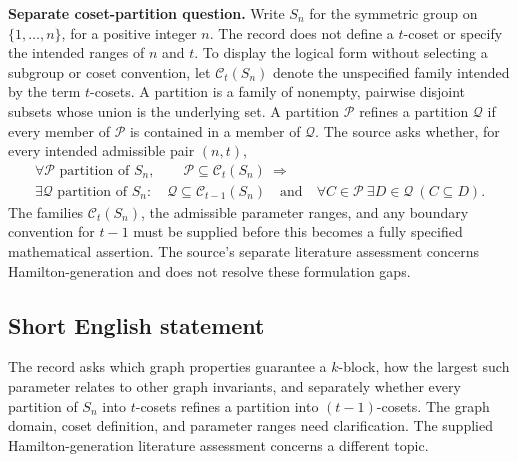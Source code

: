 \documentclass[11pt]{article}
\begin{document}
\textbf{Separate coset-partition question.} Write \(S_n\) for the symmetric group on \(\{1,\ldots,n\}\), for a positive integer \(n\). The record does not define a \(t\)-coset or specify the intended ranges of \(n\) and \(t\). To display the logical form without selecting a subgroup or coset convention, let \(\mathcal C_t(S_n)\) denote the unspecified family intended by the term \(t\)-cosets. A partition is a family of nonempty, pairwise disjoint subsets whose union is the underlying set. A partition \(\mathcal P\) refines a partition \(\mathcal Q\) if every member of \(\mathcal P\) is contained in a member of \(\mathcal Q\). The source asks whether, for every intended admissible pair \((n,t)\),
\[
\begin{gathered}
 \forall\mathcal P\text{ partition of }S_n,\qquad
 \mathcal P\subseteq\mathcal C_t(S_n)
 \ \Longrightarrow\\
 \exists\mathcal Q\text{ partition of }S_n:\quad
 \mathcal Q\subseteq\mathcal C_{t-1}(S_n)
 \quad\text{and}\quad
 \forall C\in\mathcal P\ \exists D\in\mathcal Q\ (C\subseteq D).
\end{gathered}
\]
The families \(\mathcal C_t(S_n)\), the admissible parameter ranges, and any boundary convention for \(t-1\) must be supplied before this becomes a fully specified mathematical assertion. The source's separate literature assessment concerns Hamilton-generation and does not resolve these formulation gaps.
\subsection{Short English statement}
The record asks which graph properties guarantee a \(k\)-block, how the largest such parameter relates to other graph invariants, and separately whether every partition of \(S_n\) into \(t\)-cosets refines a partition into \((t-1)\)-cosets. The graph domain, coset definition, and parameter ranges need clarification. The supplied Hamilton-generation literature assessment concerns a different topic.
\end{document}
